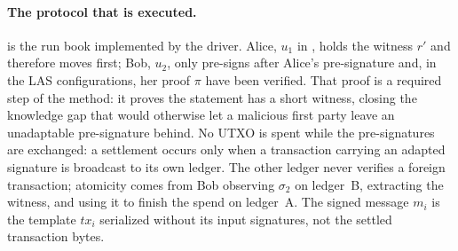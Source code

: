 \paragraph{The protocol that is executed.}
 is the run book implemented by the driver. Alice, $u_1$ in \cite{esgin2020post}, holds the witness $r'$ and therefore moves first;
Bob, $u_2$, only
pre-signs after Alice's pre-signature and, in the LAS configurations, her proof $\pi$
have been verified. That proof is
a required step of the method: it proves the statement has a short witness, closing
the knowledge gap that would otherwise let a malicious first party leave an unadaptable
pre-signature behind. No UTXO is spent while the pre-signatures are
exchanged: a settlement occurs only when a transaction carrying an adapted signature is
broadcast to its own ledger. The other ledger never verifies
a foreign transaction; atomicity comes from Bob observing $\sigma_2$ on ledger~B, extracting
the witness, and using it to finish the spend on ledger~A.
The signed message $m_i$ is
the template $\mathit{tx}_i$ serialized without its input signatures, not the settled
transaction bytes.

